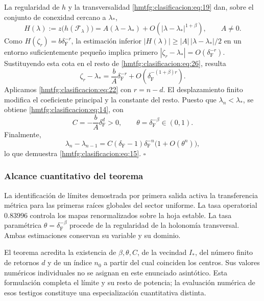La regularidad de \(h\) y la transversalidad \eqref{hmtfg:clasificacion:eq:19} dan, sobre el conjunto de conexidad cercano a \(\lambda_*\),
\begin{equation}
H(\lambda):=z\bigl(h(\mathcal F_\lambda)\bigr)
=A(\lambda-\lambda_*)
+O\!\left(|\lambda-\lambda_*|^{1+\beta}\right),
\qquad A\ne0.
\label{hmtfg:clasificacion:eq:26}
\end{equation}
Como \(H(\zeta_r)=b\delta_{\mathrm F}^{-r}\), la estimación inferior
\(|H(\lambda)|\ge |A|\,|\lambda-\lambda_*|/2\) en un entorno suficientemente pequeño implica primero
\(|\zeta_r-\lambda_*|=O(\delta_{\mathrm F}^{-r})\). Sustituyendo esta cota en el resto de \eqref{hmtfg:clasificacion:eq:26}, resulta
\begin{equation}
\zeta_r-\lambda_*=\frac bA\delta_{\mathrm F}^{-r}
+O\!\left(\delta_{\mathrm F}^{-(1+\beta)r}\right).
\label{hmtfg:clasificacion:eq:27}
\end{equation}
Aplicamos \eqref{hmtfg:clasificacion:eq:22} con \(r=n-d\). El desplazamiento finito modifica el coeficiente principal y la constante del resto. Puesto que \(\lambda_n<\lambda_*\), se obtiene \eqref{hmtfg:clasificacion:eq:14}, con
\[
C=-\frac bA\delta_{\mathrm F}^d>0,
\qquad \theta=\delta_{\mathrm F}^{-\beta}\in(0,1).
\]
Finalmente,
\[
\lambda_n-\lambda_{n-1}
=C(\delta_{\mathrm F}-1)\delta_{\mathrm F}^{-n}\bigl(1+O(\theta^n)\bigr),
\]
lo que demuestra \eqref{hmtfg:clasificacion:eq:15}. \(\square\)


\subsubsection{Alcance cuantitativo del teorema}
\label{hmtfg:clasificacion:8.5}

La identificación de límites demostrada por primera salida activa la transferencia métrica para las primeras raíces globales del sector uniforme. La tasa operatorial \(0.83996\) controla los mapas renormalizados sobre la hoja estable. La tasa paramétrica \(\theta=\delta_{\mathrm F}^{-\beta}\) procede de la regularidad de la holonomía transversal. Ambas estimaciones conservan su variable y su dominio.

El teorema acredita la existencia de \(\beta,\theta,C\), de la vecindad \(I_*\), del número finito de retornos \(d\) y de un índice \(n_0\) a partir del cual coinciden los centros. Sus valores numéricos individuales no se asignan en este enunciado asintótico. Esta formulación completa el límite y su resto de potencia; la evaluación numérica de esos testigos constituye una especialización cuantitativa distinta.

